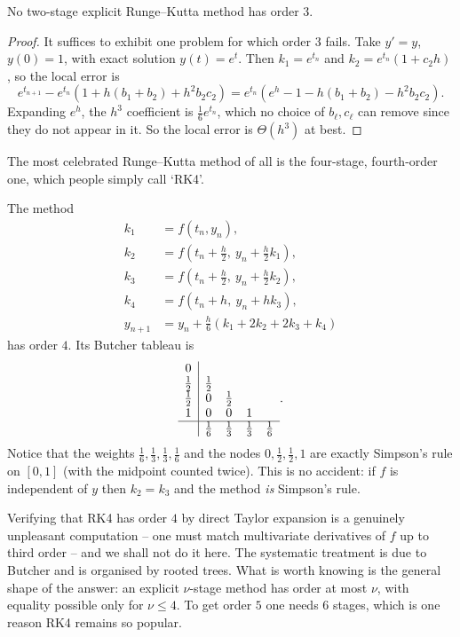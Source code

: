 \documentclass[a4paper]{scrartcl}
\begin{document}
\begin{proposition}
  No two-stage explicit Runge--Kutta method has order $3$.
\end{proposition}
\begin{proof}
  It suffices to exhibit one problem for which order $3$ fails. Take $y' = y$, $y(0) = 1$, with exact solution $y(t) = e^t$. Then $k_1 = e^{t_n}$ and $k_2 = e^{t_n}(1 + c_2h)$, so the local error is
  $$
  e^{t_{n+1}} - e^{t_n}\left(1 + h(b_1+b_2) + h^2b_2c_2\right) = e^{t_n}\left(e^h - 1 - h(b_1+b_2) - h^2 b_2c_2\right).
  $$
  Expanding $e^h$, the $h^3$ coefficient is $\tfrac16 e^{t_n}$, which no choice of $b_\ell, c_\ell$ can remove since they do not appear in it. So the local error is $\Theta(h^3)$ at best.
\end{proof}

The most celebrated Runge--Kutta method of all is the four-stage, fourth-order one, which people simply call `RK4'.

\begin{example}
  The method
  \begin{align*}
    k_1 &= f(t_n, y_n),\\
    k_2 &= f(t_n + \tfrac{h}{2},\ y_n + \tfrac{h}{2}k_1),\\
    k_3 &= f(t_n + \tfrac{h}{2},\ y_n + \tfrac{h}{2}k_2),\\
    k_4 &= f(t_n + h,\ y_n + hk_3),\\
    y_{n+1} &= y_n + \tfrac{h}{6}\left(k_1 + 2k_2 + 2k_3 + k_4\right)
  \end{align*}
  has order $4$. Its Butcher tableau is
  $$
  \begin{array}{c|cccc}
    0 & & & &\\
    \tfrac12 & \tfrac12 & & &\\
    \tfrac12 & 0 & \tfrac12 & &\\
    1 & 0 & 0 & 1 &\\\hline
      & \tfrac16 & \tfrac13 & \tfrac13 & \tfrac16
  \end{array}.
  $$
  Notice that the weights $\tfrac16, \tfrac13, \tfrac13, \tfrac16$ and the nodes $0, \tfrac12, \tfrac12, 1$ are exactly Simpson's rule on $[0,1]$ (with the midpoint counted twice). This is no accident: if $f$ is independent of $y$ then $k_2 = k_3$ and the method \emph{is} Simpson's rule.
\end{example}

\begin{remark}
  Verifying that RK4 has order $4$ by direct Taylor expansion is a genuinely unpleasant computation -- one must match multivariate derivatives of $f$ up to third order -- and we shall not do it here. The systematic treatment is due to Butcher and is organised by rooted trees. What is worth knowing is the general shape of the answer: an explicit $\nu$-stage method has order at most $\nu$, with equality possible only for $\nu \leq 4$. To get order $5$ one needs $6$ stages, which is one reason RK4 remains so popular.
\end{remark}
\end{document}
